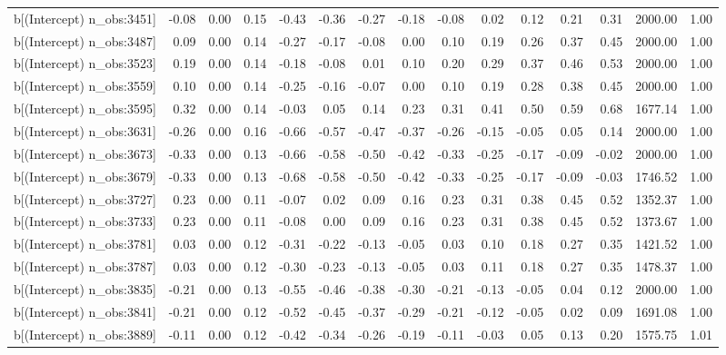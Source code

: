 \begin{table}[ht]
\begin{tabular}{rrrrrrrrrrrrrrr}
  b[(Intercept) n\_obs:3451] & -0.08 & 0.00 & 0.15 & -0.43 & -0.36 & -0.27 & -0.18 & -0.08 & 0.02 & 0.12 & 0.21 & 0.31 & 2000.00 & 1.00 \\ 
  b[(Intercept) n\_obs:3487] & 0.09 & 0.00 & 0.14 & -0.27 & -0.17 & -0.08 & 0.00 & 0.10 & 0.19 & 0.26 & 0.37 & 0.45 & 2000.00 & 1.00 \\ 
  b[(Intercept) n\_obs:3523] & 0.19 & 0.00 & 0.14 & -0.18 & -0.08 & 0.01 & 0.10 & 0.20 & 0.29 & 0.37 & 0.46 & 0.53 & 2000.00 & 1.00 \\ 
  b[(Intercept) n\_obs:3559] & 0.10 & 0.00 & 0.14 & -0.25 & -0.16 & -0.07 & 0.00 & 0.10 & 0.19 & 0.28 & 0.38 & 0.45 & 2000.00 & 1.00 \\ 
  b[(Intercept) n\_obs:3595] & 0.32 & 0.00 & 0.14 & -0.03 & 0.05 & 0.14 & 0.23 & 0.31 & 0.41 & 0.50 & 0.59 & 0.68 & 1677.14 & 1.00 \\ 
  b[(Intercept) n\_obs:3631] & -0.26 & 0.00 & 0.16 & -0.66 & -0.57 & -0.47 & -0.37 & -0.26 & -0.15 & -0.05 & 0.05 & 0.14 & 2000.00 & 1.00 \\ 
  b[(Intercept) n\_obs:3673] & -0.33 & 0.00 & 0.13 & -0.66 & -0.58 & -0.50 & -0.42 & -0.33 & -0.25 & -0.17 & -0.09 & -0.02 & 2000.00 & 1.00 \\ 
  b[(Intercept) n\_obs:3679] & -0.33 & 0.00 & 0.13 & -0.68 & -0.58 & -0.50 & -0.42 & -0.33 & -0.25 & -0.17 & -0.09 & -0.03 & 1746.52 & 1.00 \\ 
  b[(Intercept) n\_obs:3727] & 0.23 & 0.00 & 0.11 & -0.07 & 0.02 & 0.09 & 0.16 & 0.23 & 0.31 & 0.38 & 0.45 & 0.52 & 1352.37 & 1.00 \\ 
  b[(Intercept) n\_obs:3733] & 0.23 & 0.00 & 0.11 & -0.08 & 0.00 & 0.09 & 0.16 & 0.23 & 0.31 & 0.38 & 0.45 & 0.52 & 1373.67 & 1.00 \\ 
  b[(Intercept) n\_obs:3781] & 0.03 & 0.00 & 0.12 & -0.31 & -0.22 & -0.13 & -0.05 & 0.03 & 0.10 & 0.18 & 0.27 & 0.35 & 1421.52 & 1.00 \\ 
  b[(Intercept) n\_obs:3787] & 0.03 & 0.00 & 0.12 & -0.30 & -0.23 & -0.13 & -0.05 & 0.03 & 0.11 & 0.18 & 0.27 & 0.35 & 1478.37 & 1.00 \\ 
  b[(Intercept) n\_obs:3835] & -0.21 & 0.00 & 0.13 & -0.55 & -0.46 & -0.38 & -0.30 & -0.21 & -0.13 & -0.05 & 0.04 & 0.12 & 2000.00 & 1.00 \\ 
  b[(Intercept) n\_obs:3841] & -0.21 & 0.00 & 0.12 & -0.52 & -0.45 & -0.37 & -0.29 & -0.21 & -0.12 & -0.05 & 0.02 & 0.09 & 1691.08 & 1.00 \\ 
  b[(Intercept) n\_obs:3889] & -0.11 & 0.00 & 0.12 & -0.42 & -0.34 & -0.26 & -0.19 & -0.11 & -0.03 & 0.05 & 0.13 & 0.20 & 1575.75 & 1.01 \\ 

\end{tabular}
\end{table}
